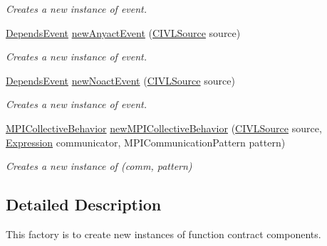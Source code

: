 \begin{DoxyCompactItemize}
\begin{DoxyCompactList}\small\item\em Creates a new instance of {\ttfamily } event. \end{DoxyCompactList}\item 
\hyperlink{interfaceedu_1_1udel_1_1cis_1_1vsl_1_1civl_1_1model_1_1IF_1_1contract_1_1DependsEvent}{Depends\+Event} \hyperlink{interfaceedu_1_1udel_1_1cis_1_1vsl_1_1civl_1_1model_1_1IF_1_1contract_1_1ContractFactory_a64e32e19ab3ba93f6419ee66e54ae346}{new\+Anyact\+Event} (\hyperlink{interfaceedu_1_1udel_1_1cis_1_1vsl_1_1civl_1_1model_1_1IF_1_1CIVLSource}{C\+I\+V\+L\+Source} source)
\begin{DoxyCompactList}\small\item\em Creates a new instance of {\ttfamily } event. \end{DoxyCompactList}\item 
\hyperlink{interfaceedu_1_1udel_1_1cis_1_1vsl_1_1civl_1_1model_1_1IF_1_1contract_1_1DependsEvent}{Depends\+Event} \hyperlink{interfaceedu_1_1udel_1_1cis_1_1vsl_1_1civl_1_1model_1_1IF_1_1contract_1_1ContractFactory_ae1f75a5f776d6d148de9caec8c54878a}{new\+Noact\+Event} (\hyperlink{interfaceedu_1_1udel_1_1cis_1_1vsl_1_1civl_1_1model_1_1IF_1_1CIVLSource}{C\+I\+V\+L\+Source} source)
\begin{DoxyCompactList}\small\item\em Creates a new instance of {\ttfamily } event. \end{DoxyCompactList}\item 
\hyperlink{interfaceedu_1_1udel_1_1cis_1_1vsl_1_1civl_1_1model_1_1IF_1_1contract_1_1MPICollectiveBehavior}{M\+P\+I\+Collective\+Behavior} \hyperlink{interfaceedu_1_1udel_1_1cis_1_1vsl_1_1civl_1_1model_1_1IF_1_1contract_1_1ContractFactory_a2ded055a3b2620f25baddb6266a001de}{new\+M\+P\+I\+Collective\+Behavior} (\hyperlink{interfaceedu_1_1udel_1_1cis_1_1vsl_1_1civl_1_1model_1_1IF_1_1CIVLSource}{C\+I\+V\+L\+Source} source, \hyperlink{interfaceedu_1_1udel_1_1cis_1_1vsl_1_1civl_1_1model_1_1IF_1_1expression_1_1Expression}{Expression} communicator, M\+P\+I\+Communication\+Pattern pattern)
\begin{DoxyCompactList}\small\item\em Creates a new instance of {\ttfamily (comm, pattern)} \end{DoxyCompactList}\end{DoxyCompactItemize}


\subsection{Detailed Description}
This factory is to create new instances of function contract components. 

